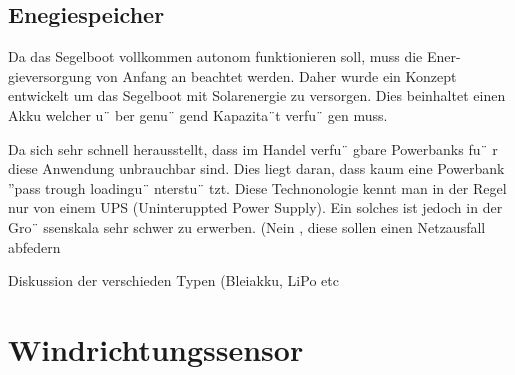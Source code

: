 \subsection{Enegiespeicher}
Da das Segelboot vollkommen autonom funktionieren soll, muss die Ener- gieversorgung von Anfang an beachtet werden. Daher wurde ein Konzept entwickelt um das Segelboot mit Solarenergie zu versorgen. Dies beinhaltet einen Akku welcher u¨ ber genu¨ gend Kapazita¨t verfu¨ gen muss.

Da sich sehr schnell herausstellt, dass im Handel verfu¨ gbare Powerbanks fu¨ r diese Anwendung unbrauchbar sind. Dies liegt daran, dass kaum eine Powerbank ”pass trough loadingu¨ nterstu¨ tzt. Diese Technonologie kennt man in der Regel nur von einem UPS (Uninteruppted Power Supply). Ein solches ist jedoch in der Gro¨ ssenskala sehr schwer zu erwerben. (Nein , diese sollen einen Netzausfall abfedern

Diskussion der verschieden Typen (Bleiakku, LiPo etc

 

\section{Windrichtungssensor}








